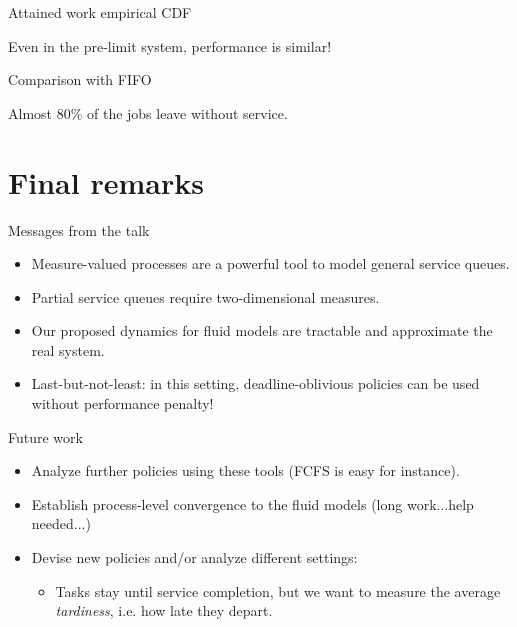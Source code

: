 \documentclass[aspectratio=169]{beamer}
\newenvironment*{myitem}[1][1.5em]{\begin{itemize}\setlength{\itemsep}{#1}}{\end{itemize}}
\begin{document}
\begin{frame}{Attained work empirical CDF}

	\begin{center}
    
    \end{center}
    
	\vfill

	Even in the pre-limit system, performance is similar!
\end{frame}

\begin{frame}{Comparison with FIFO}

	\begin{center}
	
	\end{center}

	\vfill

	Almost 80\% of the jobs leave without service.
\end{frame}

\section{Final remarks}

\begin{frame}{Messages from the talk}
	
	\begin{myitem}
		\item Measure-valued processes are a powerful tool to model general service queues.
		\item Partial service queues require two-dimensional measures.
		\item Our proposed dynamics for fluid models are tractable and approximate the real system.
		\item Last-but-not-least: in this setting, \alert{deadline-oblivious} policies can be used without performance penalty!
	\end{myitem}
\end{frame}

\begin{frame}{Future work}
	
	\begin{myitem}
		\item Analyze further policies using these tools (FCFS is easy for instance).
		\item Establish process-level convergence to the fluid models (long work...help needed...)
		\item Devise new policies and/or analyze different settings:
		
		\begin{itemize}
			\item Tasks stay until service completion, but we want to measure the average \emph{tardiness}, i.e. how late they depart.
		\end{itemize}
	\end{myitem}
\end{frame}
\end{document}

